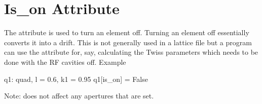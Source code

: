 \section{Is\_on Attribute}
\label{s:is_on}

The  attribute is used to turn an element off. Turning
an element off essentially converts it into a drift. This is not
generally used in a lattice file but a program can use the attribute
for, say, calculating the Twiss parameters which needs to be done
with the RF cavities off. Example
\begin{example}
  q1: quad, l = 0.6, k1 = 0.95
  q1[is_on] = False
\end{example}
Note:  does not affect any apertures that are set.